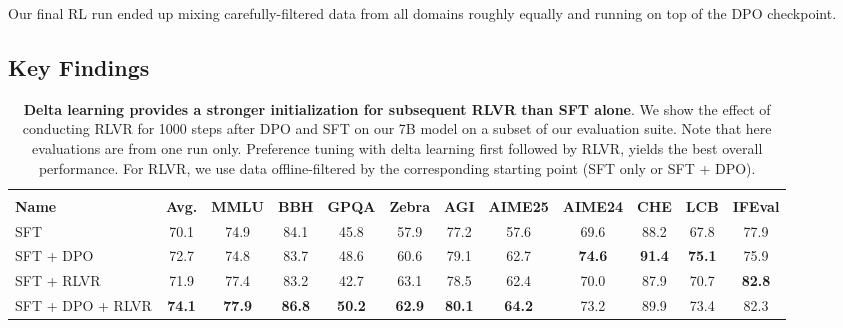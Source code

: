 \documentclass[table]{ai2style/ai2}
\newcommand{\olmothreethinking}{\textsc{Olmo~3 Think}\xspace}
\begin{document}
{{Our final RL run ended up mixing carefully-filtered data from all domains roughly equally and running on top of the DPO checkpoint.

\subsection{Key Findings}
\label{sec:thinkfindings}

\begin{table}[tbp]
\centering
\small
\begin{tabular}{@{}l >{\columncolor{ai2pink!18}}c cccccccccc@{}}
\toprule
& \multicolumn{11}{c}{\textbf{Subset of \olmothreethinking Benchmarks}} \\
\cmidrule(lr){2-12}
\textbf{Name} & \cellcolor{ai2pink!18}\textbf{Avg.} & \textbf{MMLU} & \textbf{BBH} & \textbf{GPQA} & \textbf{Zebra} & \textbf{AGI} & \textbf{AIME25} & \textbf{AIME24} & \textbf{CHE} & \textbf{LCB} & \textbf{IFEval} \\
\midrule
SFT & 70.1 & 74.9 & 84.1 & 45.8 & 57.9 & 77.2 & 57.6 & 69.6 & 88.2 & 67.8 & 77.9 \\
SFT + DPO & 72.7 & 74.8 & 83.7 & 48.6 & 60.6 & 79.1  & 62.7 & {\bf 74.6} & {\bf 91.4} & {\bf 75.1} & 75.9 \\
SFT + RLVR & 71.9 & 77.4 & 83.2 & 42.7 & 63.1 & 78.5 & 62.4 & 70.0 & 87.9 & 70.7 & {\bf 82.8} \\
SFT + DPO + RLVR & {\bf 74.1} & {\bf 77.9} & {\bf 86.8} & {\bf 50.2} & {\bf 62.9} & {\bf 80.1} & {\bf 64.2} & 73.2 & 89.9 & 73.4 & 82.3 \\
\bottomrule
\end{tabular}
\caption{\textbf{Delta learning provides a stronger initialization for subsequent RLVR than SFT alone}. We show the effect of conducting RLVR for 1000 steps after DPO and SFT on our 7B model on a subset of our evaluation suite. Note that here evaluations are from one run only. Preference tuning with delta learning first followed by RLVR, yields the best overall performance. For RLVR, we use data offline-filtered by the corresponding starting point (SFT only or SFT + DPO).}
\label{tab:dpo_rl_sequence}
\end{table}

}}
\end{document}
